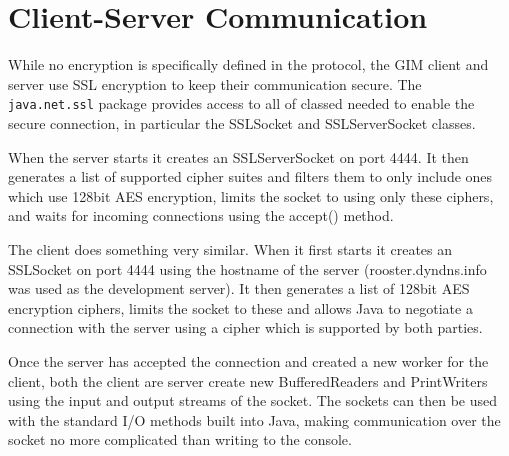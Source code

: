 \section{Client-Server Communication}
While no encryption is specifically defined in the protocol, the GIM client and server use SSL encryption to keep their communication secure. The \texttt{java.net.ssl} package provides access to all of classed needed to enable the secure connection, in particular the SSLSocket and SSLServerSocket classes.

When the server starts it creates an SSLServerSocket on port 4444. It then generates a list of supported cipher suites and filters them to only include ones which use 128bit AES encryption, limits the socket to using only these ciphers, and waits for incoming connections using the accept() method.

The client does something very similar. When it first starts it creates an SSLSocket on port 4444 using the hostname of the server (rooster.dyndns.info was used as the development server). It then generates a list of 128bit AES encryption ciphers, limits the socket to these and allows Java to negotiate a connection with the server using a cipher which is supported by both parties.

Once the server has accepted the connection and created a new worker for the client, both the client are server create new BufferedReaders and PrintWriters using the input and output streams of the socket. The sockets can then be used  with  the standard I/O methods built into Java, making communication over the socket no more complicated than writing to the console.
